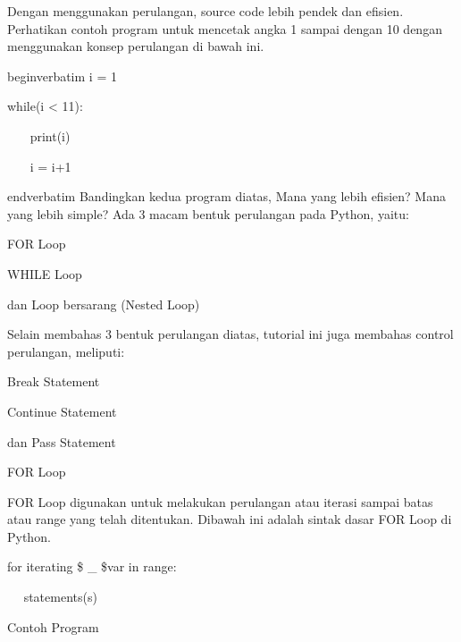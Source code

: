 \vspace{\baselineskip}
Dengan menggunakan perulangan, source code lebih pendek dan efisien. Perhatikan contoh program untuk mencetak angka 1 sampai dengan 10 dengan menggunakan konsep perulangan di bawah ini.\vspace{\baselineskip}
\vspace{\baselineskip}
 \par
\vspace{12pt}
begin{verbatim}
i = 1 \par
while(i < 11): \par
~~~ print(i) \par
~~~ i = i+1 \par
end{verbatim}
\vspace{\baselineskip}
Bandingkan kedua program diatas, Mana yang lebih efisien? Mana yang lebih simple?\vspace{\baselineskip}
\vspace{\baselineskip}
Ada 3 macam bentuk perulangan pada Python, yaitu: \par
FOR Loop \par
WHILE Loop \par
dan Loop bersarang (Nested Loop) \par
\vspace{\baselineskip}
Selain membahas 3 bentuk perulangan diatas, tutorial ini juga membahas control perulangan, meliputi: \par
Break Statement \par
Continue Statement \par
dan Pass Statement \par
\vspace{\baselineskip}
\vspace{12pt}
FOR Loop \par
FOR Loop digunakan untuk melakukan perulangan atau iterasi sampai batas atau range yang telah ditentukan.\vspace{\baselineskip}
\vspace{\baselineskip}
Dibawah ini adalah sintak dasar FOR Loop di Python.\vspace{\baselineskip}
\vspace{\baselineskip}
 \par
for iterating \$  \_  \$var in range: \par
~~ statements(s) \par
\vspace{\baselineskip}
Contoh Program\vspace{\baselineskip}
\vspace{\baselineskip}
